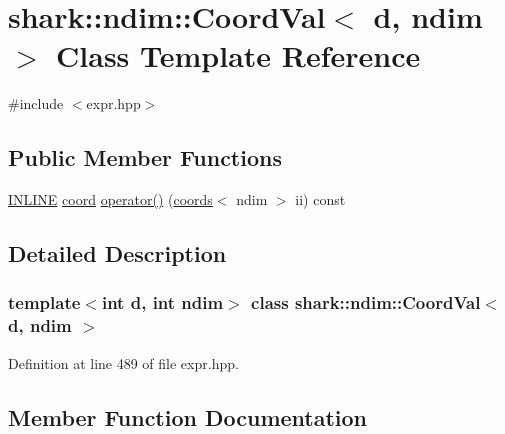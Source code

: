 \hypertarget{classshark_1_1ndim_1_1_coord_val}{}\section{shark\+:\+:ndim\+:\+:Coord\+Val$<$ d, ndim $>$ Class Template Reference}
\label{classshark_1_1ndim_1_1_coord_val}


{\ttfamily \#include $<$expr.\+hpp$>$}

\subsection*{Public Member Functions}
\begin{DoxyCompactItemize}
\item 
\hyperlink{common_8hpp_a2eb6f9e0395b47b8d5e3eeae4fe0c116}{I\+N\+L\+I\+NE} \hyperlink{namespaceshark_a767a92d5dd82cb82266473bff42fa6d9}{coord} \hyperlink{classshark_1_1ndim_1_1_coord_val_a6083364036aac70ea67c0d0fc5720c7b}{operator()} (\hyperlink{structshark_1_1ndim_1_1coords}{coords}$<$ ndim $>$ ii) const
\end{DoxyCompactItemize}


\subsection{Detailed Description}
\subsubsection*{template$<$int d, int ndim$>$\newline
class shark\+::ndim\+::\+Coord\+Val$<$ d, ndim $>$}



Definition at line 489 of file expr.\+hpp.



\subsection{Member Function Documentation}
\hypertarget{classshark_1_1ndim_1_1_coord_val_a6083364036aac70ea67c0d0fc5720c7b}{}\label{classshark_1_1ndim_1_1_coord_val_a6083364036aac70ea67c0d0fc5720c7b} 
